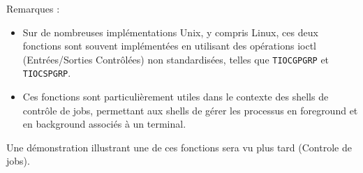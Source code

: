 Remarques :
\begin{itemize}
    \item Sur de nombreuses implémentations Unix, y compris Linux, ces deux fonctions sont souvent implémentées en utilisant des opérations ioctl (Entrées/Sorties Contrôlées) non standardisées, telles que \texttt{TIOCGPGRP} et \texttt{TIOCSPGRP}.
    \item Ces fonctions sont particulièrement utiles dans le contexte des shells de contrôle de jobs, permettant aux shells de gérer les processus en foreground et en background associés à un terminal.
\end{itemize}

Une démonstration illustrant une de ces fonctions sera vu plus tard (Controle de jobs).



